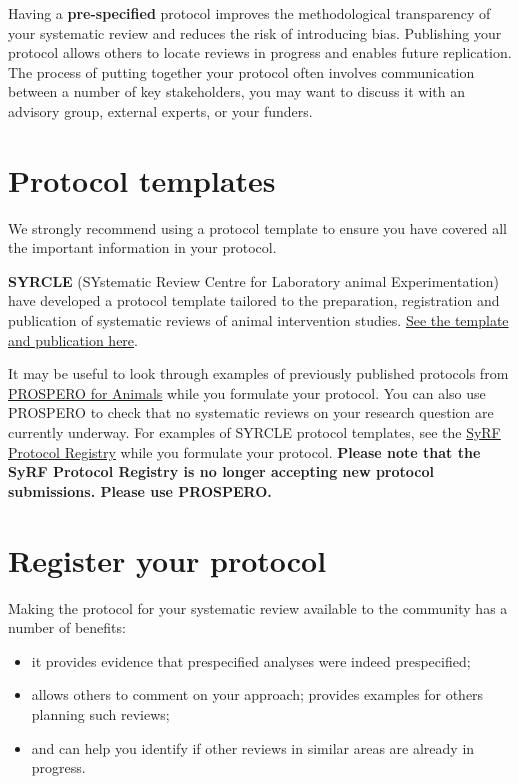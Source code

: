 \documentclass[
]{book}
\providecommand{\tightlist}{%
  \setlength{\itemsep}{0pt}\setlength{\parskip}{0pt}}
\begin{document}
Having a \textbf{pre-specified} protocol improves the methodological transparency of your systematic review and reduces the risk of introducing bias. Publishing your protocol allows others to locate reviews in progress and enables future replication. The process of putting together your protocol often involves communication between a number of key stakeholders, you may want to discuss it with an advisory group, external experts, or your funders.

\section{Protocol templates}\label{protocol-templates}

We strongly recommend using a protocol template to ensure you have covered all the important information in your protocol.

\textbf{SYRCLE} (SYstematic Review Centre for Laboratory animal Experimentation) have developed a protocol template tailored to the preparation, registration and publication of systematic reviews of animal intervention studies. \href{https://onlinelibrary.wiley.com/doi/epdf/10.1002/ebm2.7}{See the template and publication here}.

It may be useful to look through examples of previously published protocols from \href{https://www.crd.york.ac.uk/prospero/\#searchadvanced}{PROSPERO for Animals} while you formulate your protocol. You can also use PROSPERO to check that no systematic reviews on your research question are currently underway. For examples of SYRCLE protocol templates, see the \href{https://syrf.org.uk/protocols/}{SyRF Protocol Registry} while you formulate your protocol. \textbf{Please note that the SyRF Protocol Registry is no longer accepting new protocol submissions. Please use PROSPERO.}

\section{Register your protocol}\label{register-your-protocol}

Making the protocol for your systematic review available to the community has a number of benefits:

\begin{itemize}
\tightlist
\item
  it provides evidence that prespecified analyses were indeed prespecified;
\item
  allows others to comment on your approach; provides examples for others planning such reviews;
\item
  and can help you identify if other reviews in similar areas are already in progress.
\end{itemize}
\end{document}
